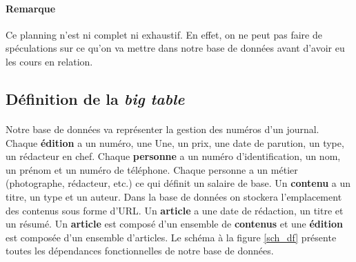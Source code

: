 \paragraph{Remarque}{
    Ce planning n'est ni complet ni exhaustif. En effet, on ne peut pas faire de spéculations sur ce qu'on va mettre dans notre base de données avant d'avoir eu les cours en relation.
}

\subsection{Définition de la \textit{big table}}

\paragraph{}{
    Notre base de données va représenter la gestion des numéros d'un journal. Chaque \textbf{édition} a un numéro, une Une, un prix, une date de parution, un type, un rédacteur en chef. Chaque \textbf{personne} a un numéro d'identification, un nom, un prénom et un numéro de téléphone. Chaque personne a un métier (photographe, rédacteur, etc.) ce qui définit un salaire de base. Un \textbf{contenu} a un titre, un type et un auteur. Dans la base de données on stockera l'emplacement des contenus sous forme d'URL. Un \textbf{article} a une date de rédaction, un titre et un résumé. Un \textbf{article} est composé d'un ensemble de \textbf{contenus} et une \textbf{édition} est composée d'un ensemble d'articles. \newline
    Le schéma à la figure \ref{sch_df} présente toutes les dépendances fonctionnelles de notre base de données.
}